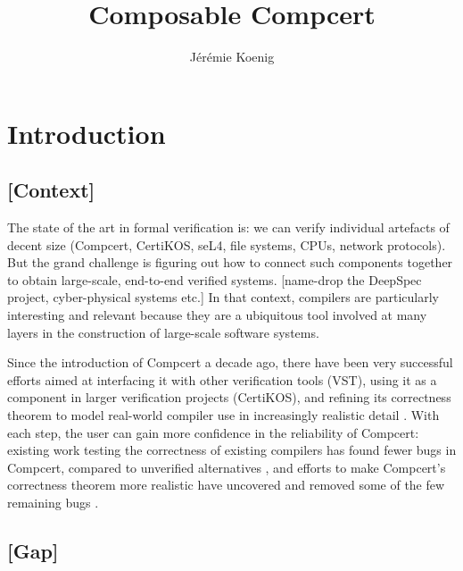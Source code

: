 \documentclass[acmsmall,10pt,review,anonymous]{acmart}
\begin{document}
\title{%
  Composable Compcert%
}

\author{J\'er\'emie Koenig}

\begin{abstract} %
\end{abstract}

\maketitle

\section{Introduction} %

\subsection{[Context]}

The state of the art in formal verification is:
we can verify individual artefacts of decent size
(Compcert, CertiKOS, seL4, file systems, CPUs, network protocols).
But the grand challenge is figuring out
how to connect such components together
to obtain large-scale, end-to-end verified systems.
[name-drop the DeepSpec project, cyber-physical systems etc.]
In that context,
compilers are particularly interesting and relevant
because they are a ubiquitous tool
involved at many layers
in the construction of large-scale software systems.

Since the introduction of Compcert \cite{compcert} a decade ago,
there have been very successful efforts aimed at
interfacing it with other verification tools (VST),
using it as a component in larger verification projects (CertiKOS),
and refining its correctness theorem
to model real-world compiler use
in increasingly realistic detail
\citep{qompcert,sepcompcert,compcompcert,compcerttso,compcertshm}.
With each step,
the user can gain more confidence in the reliability of Compcert:
existing work testing the correctness of existing compilers
has found fewer bugs in Compcert,
compared to unverified alternatives \citep{csmith},
and efforts to make Compcert's correctness theorem more realistic
have uncovered and removed some of the few remaining bugs \citep{sepcompcert}.

\subsection{[Gap]}
\end{document}
